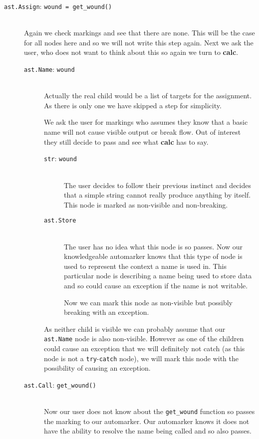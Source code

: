 \documentclass[twoside,a4paper]{report}
\begin{document}
\begin{description}
  \item[\texttt{ast.Assign}: \texttt{wound = get\_wound()}] \hfill \\
  Again we check markings and see that there are none. This will be the case for all nodes here and so we will not write this step again.
  Next we ask the user, who does not want to think about this so again we turn to \textbf{calc}.
  \begin{description}
    \item[\texttt{ast.Name}: \texttt{wound}] \hfill \\
    Actually the real child would be a list of targets for the assignment. As there is only one we have skipped a step for simplicity.
    
    We ask the user for markings who assumes they know that a basic name will not cause visible output or break flow. Out of interest they still
    decide to pass and see what \textbf{calc} has to say.
    \begin{description}
      \item[\texttt{str}: \texttt{wound}] \hfill \\
      The user decides to follow their previous instinct and decides that a simple string cannot really produce anything by itself. This node is
      marked as non-visible and non-breaking.

      \item[\texttt{ast.Store}] \hfill \\
      The user has no idea what this node is so passes. Now our knowledgeable automarker knows that this type of node is used to represent the context
      a name is used in. This particular node is describing a name being used to store data and so could cause an exception if the name is not writable.
      
      Now we can mark this node as non-visible but possibly breaking with an exception.
    \end{description}

    As neither child is visible we can probably assume that our \texttt{ast.Name} node is also non-visible. However as one of the children could cause an
    exception that we will definitely not catch (as this node is not a \texttt{try}-\texttt{catch} node), we will mark this node with the possibility
    of causing an exception.

    \item[\texttt{ast.Call}: \texttt{get\_wound()}] \hfill \\
    Now our user does not know about the \texttt{get\_wound} function so passes the marking to our automarker. Our automarker knows it does not have
    the ability to resolve the name being called and so also passes.


\end{description}
\end{description}
\end{document}
